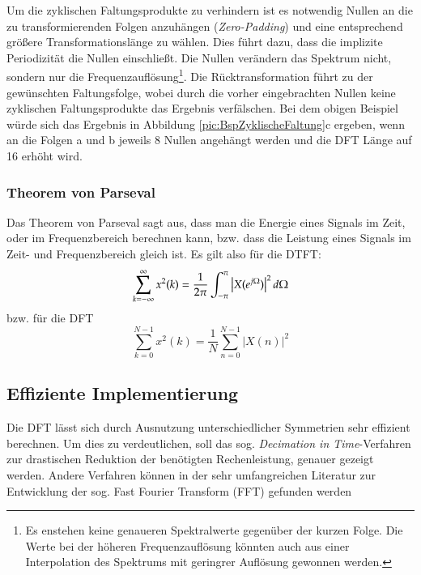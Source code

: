 Um die zyklischen Faltungsprodukte zu verhindern ist es notwendig Nullen an die
zu transformierenden Folgen anzuhängen ({\em Zero-Padding}) und eine entsprechend größere
Transformationslänge zu wählen. Dies führt dazu, dass die implizite Periodizität
die Nullen einschließt. Die Nullen verändern das Spektrum nicht, sondern nur die
Frequenzauflösung\footnote{Es enstehen keine genaueren Spektralwerte gegenüber der kurzen Folge.
Die Werte bei der höheren Frequenzauflösung könnten auch aus einer Interpolation
des Spektrums mit geringrer Auflösung gewonnen werden.}. Die Rücktransformation führt zu der
gewünschten Faltungsfolge, wobei durch die vorher eingebrachten Nullen
keine zyklischen Faltungsprodukte das Ergebnis
verfälschen. Bei dem obigen Beispiel würde sich das Ergebnis in Abbildung \ref{pic:BspZyklischeFaltung}c
ergeben, wenn an die Folgen a und b jeweils 8 Nullen angehängt werden und die DFT Länge auf 16
erhöht wird.



\subsubsection{Theorem von Parseval}
Das Theorem von Parseval sagt aus, dass man die Energie eines Signals im Zeit, oder
im Frequenzbereich berechnen kann, bzw. dass die Leistung eines Signals im Zeit- und Frequenzbereich gleich ist.
Es gilt also für die DTFT:
\begin{equation}\label{eq:ParsevalDTFT}
    \sum_{k = -\infty}^{\infty} x^2(k) = \frac{1}{2\pi} \int_{-\pi}^{\pi} \left|X (e^{j\Omega}) \right|^2 d\Omega
\end{equation}
bzw. für die DFT
\begin{equation}\label{eq:ParsevalDFT}
    \sum_{k = 0}^{N-1} x^2(k) = \frac{1}{N}\sum_{n = 0}^{N-1} |X(n)|^2
\end{equation}



\subsection{Effiziente Implementierung}
Die DFT lässt sich durch Ausnutzung unterschiedlicher Symmetrien
sehr effizient berechnen. Um dies zu verdeutlichen, soll das sog.
{\em Decimation in Time}-Verfahren zur drastischen Reduktion der
benötigten Rechenleistung, genauer gezeigt werden. Andere
Verfahren können in der sehr umfangreichen Literatur zur
Entwicklung der sog. Fast Fourier Transform (FFT) gefunden werden
\cite{Coo90, KK98,OS99}

